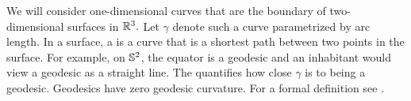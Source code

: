 We will consider one-dimensional curves that are the boundary of two-dimensional
surfaces in $\mathbb{R}^3.$ Let $\gamma$ denote such a curve parametrized by arc length.
In a surface, a  is a curve that is a shortest path
between two points in the surface. 
For example, on $\mathbb{S}^2$, the equator is a geodesic
and an inhabitant would view a geodesic as a straight line. 
The  quantifies how close $\gamma$ is to being a geodesic.
Geodesics have zero geodesic curvature. 
For a formal definition see \cite{doc76}.



